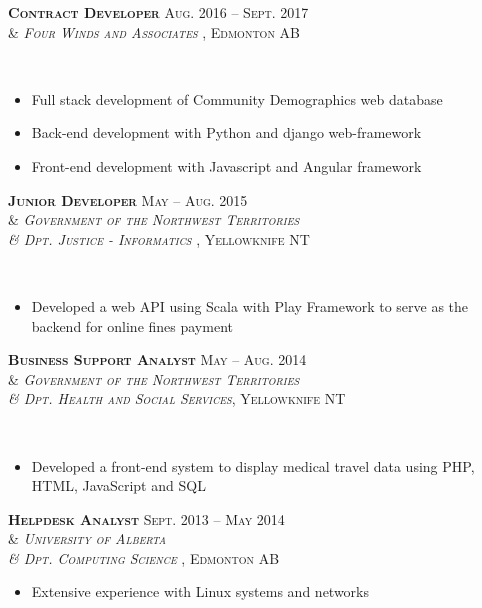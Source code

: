 \documentclass[10pt]{article} %
\begin{document}
\begin{minipage}[t]{0.52\textwidth}

{\raggedright\textsc{\textbf{Contract Developer} \hfill Aug. 2016 -- Sept. 2017\\
& \textit{Four Winds and Associates }, Edmonton AB}} \\
\begin{itemize}
\item Full stack development of Community Demographics web database 
\item Back-end development with Python and django web-framework
\item Front-end development with Javascript and Angular framework
\end{itemize} 


{\raggedright\textsc{\textbf{Junior Developer} \hfill May -- Aug. 2015\\
& \textit{Government of the Northwest Territories \\
& Dpt. Justice - Informatics }, Yellowknife NT}}\\
\begin{itemize}
\item Developed a web API using Scala with Play Framework to serve as the backend for online fines payment
\end{itemize}


{\raggedright\textsc{\textbf{Business Support Analyst} \hfill May -- Aug. 2014\\
& \textit{Government of the Northwest Territories \\
& Dpt. Health and Social Services}, Yellowknife NT}}\\
\begin{itemize}
\item Developed a front-end system to display medical travel data using PHP, HTML, JavaScript and SQL
\end{itemize}


{\raggedright\textsc{\textbf{Helpdesk Analyst} \hfill \textsc{Sept. 2013 -- May 2014} \\
& \textit{University of Alberta \\
& Dpt. Computing Science }, Edmonton AB}}
\begin{itemize}
\item Extensive experience with Linux systems and networks
\end{itemize} 




	
\end{minipage} %
\end{document}
